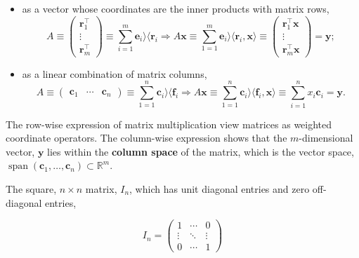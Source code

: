 \documentclass[12pt, twoside, draft]{article}
\begin{document}
\begin{itemize}[noitemsep]
\item as a vector whose coordinates are the inner products with matrix rows,
\begin{equation}\label{eq:matrix_multiplication_rows}
A  \equiv \begin{pmatrix} \mathbf{r}_1^\top \\ \vdots \\ \mathbf{r}_m^\top \end{pmatrix} \equiv \sum_{i=1}^m \mathbf{e}_i \rangle \langle \mathbf{r}_i \Rightarrow A \mathbf{x} \equiv 
\sum_{1=1}^m \mathbf{e}_i \rangle \langle \mathbf{r}_i, \mathbf{x}  \rangle \equiv \begin{pmatrix} \mathbf{r}_1^\top \mathbf{x} \\ \vdots \\ \mathbf{r}_m^\top \mathbf{x} \end{pmatrix} = \mathbf{y};
\end{equation}
\item as a linear combination of matrix columns,
\begin{equation}\label{eq:matrix_multiplication_columns}
A \equiv \begin{pmatrix} \mathbf{c}_1 & \cdots & \mathbf{c}_n \end{pmatrix} \equiv \sum_{1=1}^n \mathbf{c}_i \rangle \langle \mathbf{f}_i \Rightarrow A \mathbf{x} \equiv \sum_{1=1}^n \mathbf{c}_i \rangle \langle \mathbf{f}_i, \mathbf{x} \rangle \equiv \sum_{i=1}^n x_i \mathbf{c}_i = \mathbf{y} .
\end{equation}
\end{itemize}

The row-wise expression of matrix multiplication view matrices as weighted coordinate operators.  The column-wise expression shows that the $m$-dimensional vector, $\mathbf{y}$ lies within the \textbf{column space} of the matrix, which is the vector space, $\operatorname{span}(\mathbf{c}_1, \ldots, \mathbf{c}_n) \subset \mathbb{R}^m$. 

The square, $n \times n$ matrix, $I_n$, which has unit diagonal entries and zero off-diagonal entries,

\begin{equation}\label{eq:identity_matrix}
I_n = \begin{pmatrix} 1 & \cdots & 0 \\ \vdots & \ddots & \vdots \\ 0 & \cdots & 1 \end{pmatrix}
\end{equation}
\end{document}
